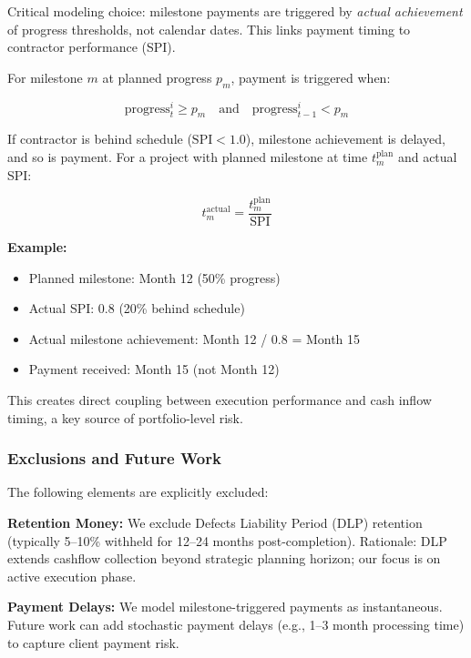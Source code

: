 Critical modeling choice: milestone payments are triggered by \textit{actual achievement} of progress thresholds, not calendar dates. This links payment timing to contractor performance (SPI).

For milestone $m$ at planned progress $p_m$, payment is triggered when:

\begin{equation}
\text{progress}_t^i \geq p_m \quad \text{and} \quad \text{progress}_{t-1}^i < p_m
\end{equation}

If contractor is behind schedule ($\text{SPI} < 1.0$), milestone achievement is delayed, and so is payment. For a project with planned milestone at time $t_m^{\text{plan}}$ and actual SPI:

\begin{equation}
t_m^{\text{actual}} = \frac{t_m^{\text{plan}}}{\text{SPI}}
\end{equation}

\textbf{Example:}
\begin{itemize}
    \item Planned milestone: Month 12 (50\% progress)
    \item Actual SPI: 0.8 (20\% behind schedule)
    \item Actual milestone achievement: Month 12 / 0.8 = Month 15
    \item Payment received: Month 15 (not Month 12)
\end{itemize}

This creates direct coupling between execution performance and cash inflow timing, a key source of portfolio-level risk.

\subsubsection{Exclusions and Future Work}

The following elements are explicitly excluded:

\textbf{Retention Money:} We exclude Defects Liability Period (DLP) retention (typically 5--10\% withheld for 12--24 months post-completion). Rationale: DLP extends cashflow collection beyond strategic planning horizon; our focus is on active execution phase.

\textbf{Payment Delays:} We model milestone-triggered payments as instantaneous. Future work can add stochastic payment delays (e.g., 1--3 month processing time) to capture client payment risk.

